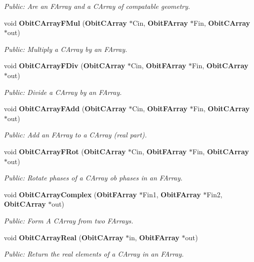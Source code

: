 \begin{CompactItemize}
\begin{CompactList}\small\item\em Public: Are an FArray and a CArray of compatable geometry. \item\end{CompactList}\item 
void {\bf Obit\-CArray\-FMul} ({\bf Obit\-CArray} $\ast$Cin, {\bf Obit\-FArray} $\ast$Fin, {\bf Obit\-CArray} $\ast$out)
\begin{CompactList}\small\item\em Public: Multiply a CArray by an FArray. \item\end{CompactList}\item 
void {\bf Obit\-CArray\-FDiv} ({\bf Obit\-CArray} $\ast$Cin, {\bf Obit\-FArray} $\ast$Fin, {\bf Obit\-CArray} $\ast$out)
\begin{CompactList}\small\item\em Public: Divide a CArray by an FArray. \item\end{CompactList}\item 
void {\bf Obit\-CArray\-FAdd} ({\bf Obit\-CArray} $\ast$Cin, {\bf Obit\-FArray} $\ast$Fin, {\bf Obit\-CArray} $\ast$out)
\begin{CompactList}\small\item\em Public: Add an FArray to a CArray (real part). \item\end{CompactList}\item 
void {\bf Obit\-CArray\-FRot} ({\bf Obit\-CArray} $\ast$Cin, {\bf Obit\-FArray} $\ast$Fin, {\bf Obit\-CArray} $\ast$out)
\begin{CompactList}\small\item\em Public: Rotate phases of a CArray ob phases in an FArray. \item\end{CompactList}\item 
void {\bf Obit\-CArray\-Complex} ({\bf Obit\-FArray} $\ast$Fin1, {\bf Obit\-FArray} $\ast$Fin2, {\bf Obit\-CArray} $\ast$out)
\begin{CompactList}\small\item\em Public: Form A CArray from two FArrays. \item\end{CompactList}\item 
void {\bf Obit\-CArray\-Real} ({\bf Obit\-CArray} $\ast$in, {\bf Obit\-FArray} $\ast$out)
\begin{CompactList}\small\item\em Public: Return the real elements of a CArray in an FArray. \item\end{CompactList}\item 

\end{CompactItemize}
